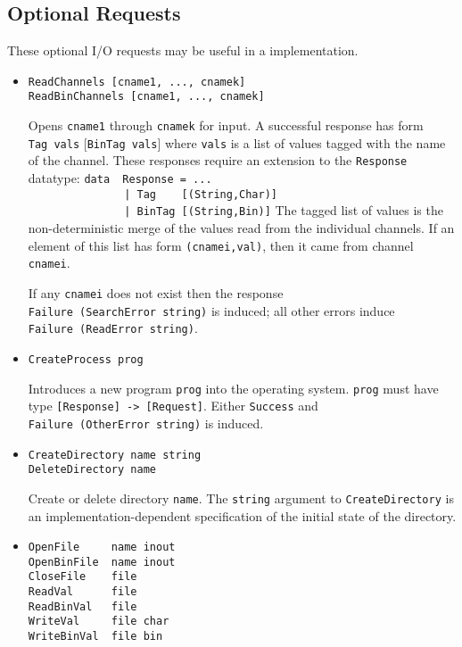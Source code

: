 %
%
\subsection{Optional Requests}
\label{io-options}

These optional I/O requests may be useful in a \Haskell{}
implementation.

\begin{itemize}
\item
\mbox{\tt ReadChannels\ [cname1,\ ...,\ cnamek]}\\
\mbox{\tt ReadBinChannels\ [cname1,\ ...,\ cnamek]}

Opens \mbox{\tt cname1} through \mbox{\tt cnamek} for input.  A successful response has
form \mbox{\tt Tag\ vals} [\mbox{\tt BinTag\ vals}] where \mbox{\tt vals} is a list of values
tagged with the name of the channel.  These responses require an
extension to the \mbox{\tt Response} datatype:
\bprog
\mbox{\tt data\ \ Response\ =\ ...}\\
\mbox{\tt \ \ \ \ \ \ \ \ \ \ \ \ \ \ \ |\ Tag\ \ \ \ [(String,Char)]}\\
\mbox{\tt \ \ \ \ \ \ \ \ \ \ \ \ \ \ \ |\ BinTag\ [(String,Bin)]}
\eprog
The tagged list of values is the non-deterministic merge of the values
read from the
individual channels.  If an element of this list has form
\mbox{\tt (cnamei,val)}, then it came from channel \mbox{\tt cnamei}.

If any \mbox{\tt cnamei} does not exist then the response 
\mbox{\tt Failure\ (SearchError\ string)} is induced; all other errors induce
\mbox{\tt Failure\ (ReadError\ string)}.

\item
\mbox{\tt CreateProcess\ prog}

Introduces a new program \mbox{\tt prog} into the operating
system.  \mbox{\tt prog} must have type \mbox{\tt [Response]\ ->\ [Request]}.  Either \mbox{\tt Success}
and \mbox{\tt Failure\ (OtherError\ string)} is induced.

\item
\mbox{\tt CreateDirectory\ name\ string}\\
\mbox{\tt DeleteDirectory\ name\ }

Create or delete directory \mbox{\tt name}.  The \mbox{\tt string} argument to
\mbox{\tt CreateDirectory} is an implementation-dependent specification of the
initial state of the directory.

\item
\mbox{\tt OpenFile\ \ \ \ \ name\ inout}\\
\mbox{\tt OpenBinFile\ \ name\ inout}\\
\mbox{\tt CloseFile\ \ \ \ file}\\
\mbox{\tt ReadVal\ \ \ \ \ \ file}\\
\mbox{\tt ReadBinVal\ \ \ file}\\
\mbox{\tt WriteVal\ \ \ \ \ file\ char}\\
\mbox{\tt WriteBinVal\ \ file\ bin}


\end{itemize}
